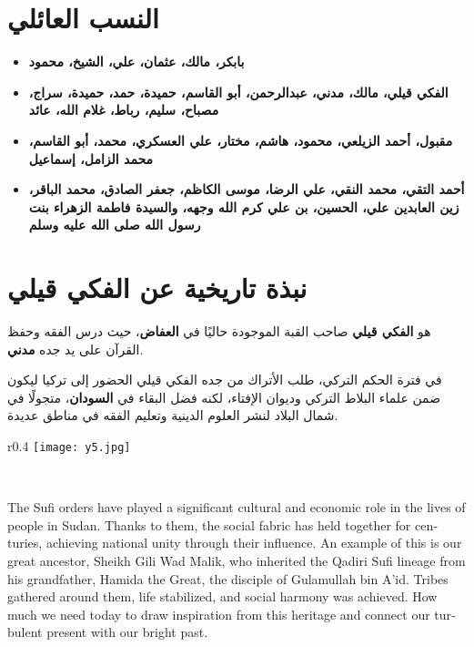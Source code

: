 \documentclass[12pt]{article}
\begin{document}
\section*{\color{sectionColor} النسب العائلي}
\begin{itemize}
    \item \textbf{بابكر، مالك، عثمان، علي، الشيخ، محمود}
    \item \textbf{الفكي قيلي، مالك، مدني، عبدالرحمن، أبو القاسم، حميدة، حمد، حميدة، سراج، مصباح، سليم، رباط، غلام الله، عائد}
    \item \textbf{مقبول، أحمد الزيلعي، محمود، هاشم، مختار، علي العسكري، محمد، أبو القاسم، محمد الزامل، إسماعيل}
    \item \textbf{أحمد التقي، محمد النقي، علي الرضا، موسى الكاظم، جعفر الصادق، محمد الباقر، زين العابدين علي، الحسين، بن علي كرم الله وجهه، والسيدة فاطمة الزهراء بنت رسول الله صلى الله عليه وسلم}
\end{itemize}

\section*{\color{sectionColor} نبذة تاريخية عن الفكي قيلي}
هو \textbf{\color{emphasisColor} الفكي قيلي} صاحب القبة الموجودة حاليًا في \textbf{العفاض}، حيث درس الفقه وحفظ القرآن على يد جده \textbf{مدني}.  

في فترة الحكم التركي، طلب الأتراك من جده الفكي قيلي الحضور إلى تركيا ليكون ضمن علماء البلاط التركي وديوان الإفتاء، لكنه فضل البقاء في \textbf{السودان}، متجولًا في شمال البلاد لنشر العلوم الدينية وتعليم الفقه في مناطق عديدة.



\begin{wrapfigure}{r}{0.4\textwidth}
\texttt{[image: y5.jpg]}
\end{wrapfigure}



\begin{english}
\begin{center}
{\Huge\textbf{\textcolor{titleColor}}} \\
\end{center}

The Sufi orders have played a significant cultural and economic role in the lives of people in Sudan. Thanks to them, the social fabric has held together for centuries, achieving national unity through their influence. An example of this is our great ancestor, Sheikh Gili Wad Malik, who inherited the Qadiri Sufi lineage from his grandfather, Hamida the Great, the disciple of Gulamullah bin A'id. Tribes gathered around them, life stabilized, and social harmony was achieved. How much we need today to draw inspiration from this heritage and connect our turbulent present with our bright past.

\end{english}
\end{document}
